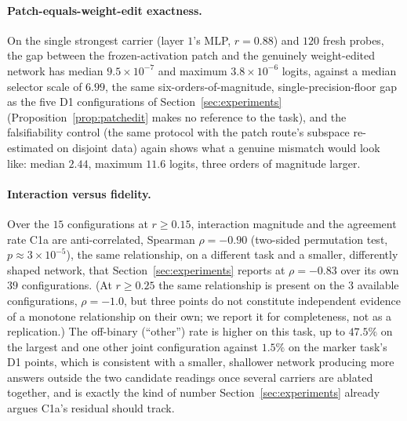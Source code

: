 \documentclass[11pt,a4paper]{article}
\begin{document}
\paragraph{Patch-equals-weight-edit exactness.} On the single strongest
carrier (layer $1$'s MLP, $r=0.88$) and $120$ fresh probes, the gap between
the frozen-activation patch and the genuinely weight-edited network has
median $9.5\times10^{-7}$ and maximum $3.8\times10^{-6}$ logits, against a
median selector scale of $6.99$, the same six-orders-of-magnitude,
single-precision-floor gap as the five D1 configurations of
Section~\ref{sec:experiments} (Proposition~\ref{prop:patchedit} makes no
reference to the task), and the falsifiability control (the same protocol
with the patch route's subspace re-estimated on disjoint data) again shows
what a genuine mismatch would look like: median $2.44$, maximum $11.6$
logits, three orders of magnitude larger.

\paragraph{Interaction versus fidelity.} Over the $15$ configurations at
$r\ge0.15$, interaction magnitude and the agreement rate C1a are
anti-correlated, Spearman $\rho=-0.90$ (two-sided permutation test,
$p\approx3\times10^{-5}$), the same relationship, on a different task and
a smaller, differently shaped network, that Section~\ref{sec:experiments}
reports at $\rho=-0.83$ over its own $39$ configurations. (At $r\ge0.25$
the same relationship is present on the $3$ available configurations,
$\rho=-1.0$, but three points do not constitute independent evidence of a
monotone relationship on their own; we report it for completeness, not as a
replication.) The off-binary (``other'') rate is higher on this task, up to
$47.5\%$ on the largest and one other joint configuration against $1.5\%$ on
the marker task's D1 points, which is consistent with a smaller, shallower network
producing more answers outside the two candidate readings once several
carriers are ablated together, and is exactly the kind of number
Section~\ref{sec:experiments} already argues C1a's residual should track.
\end{document}
